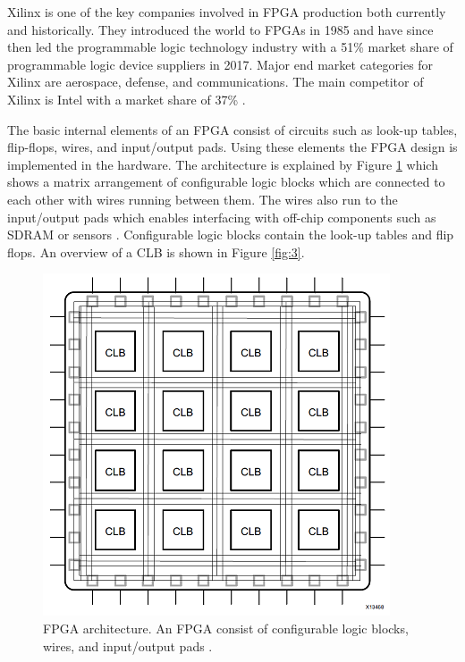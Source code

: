 \documentclass[12pt]{report}
\begin{document}
\par
Xilinx is one of the key companies involved in FPGA production both currently and historically. They introduced the world to FPGAs in 1985 and have since then led the programmable logic technology industry with a 51\% market share of programmable logic device suppliers in 2017. Major end market categories for Xilinx are aerospace, defense, and communications. The main competitor of Xilinx is Intel with a market share of 37\% \citep{XilHist}\citep{XilShare}.
\par
The basic internal elements of an FPGA consist of circuits such as look-up tables, flip-flops, wires, and input/output pads. Using these elements the FPGA design is implemented in the hardware.
The architecture is explained by Figure \ref{fig:2} which shows a matrix arrangement of configurable logic blocks which are connected to each other with wires running between them. The wires also run to the input/output pads which enables interfacing with off-chip components such as SDRAM or sensors \citep{XilFPGAIntro}. Configurable logic blocks contain the look-up tables and flip flops. An overview of a CLB is shown in Figure \ref{fig:3}.

\begin{figure}[h]
    \centering
    \includegraphics[scale=0.55]{figures/basic_fpga.png}
    \caption{FPGA architecture. An FPGA consist of configurable logic blocks, wires, and input/output pads \citep{XilFPGAIntro}.}
    \label{fig:2}
\end{figure}
\end{document}
